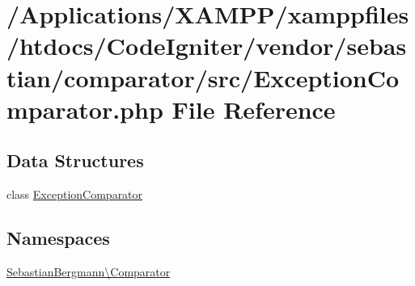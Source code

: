 \hypertarget{_exception_comparator_8php}{}\section{/\+Applications/\+X\+A\+M\+P\+P/xamppfiles/htdocs/\+Code\+Igniter/vendor/sebastian/comparator/src/\+Exception\+Comparator.php File Reference}
\label{_exception_comparator_8php}
\subsection*{Data Structures}
\begin{DoxyCompactItemize}
\item 
class \mbox{\hyperlink{class_sebastian_bergmann_1_1_comparator_1_1_exception_comparator}{Exception\+Comparator}}
\end{DoxyCompactItemize}
\subsection*{Namespaces}
\begin{DoxyCompactItemize}
\item 
 \mbox{\hyperlink{namespace_sebastian_bergmann_1_1_comparator}{Sebastian\+Bergmann\textbackslash{}\+Comparator}}
\end{DoxyCompactItemize}
